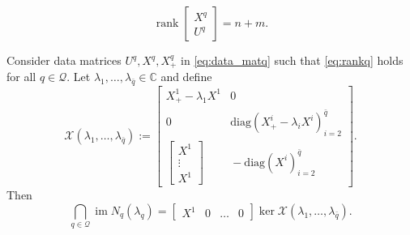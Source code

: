 \documentclass[10pt,a4paper]{amsart}
\begin{document}
\begin{equation}
    \label{eq:rankq}
    \operatorname{rank}\begin{bmatrix}
        X^q\\ U^q
    \end{bmatrix} = n + m.
\end{equation}

\begin{lemma}
    Consider data matrices $U^q, X^q, X_+^q$ in \eqref{eq:data_matq} such that \eqref{eq:rankq} holds for all $q\in\mathcal Q$. Let $\lambda_1,\dots, \lambda_{\bar q}\in\mathbb C$ and define
\begin{equation}
\label{eq:curlyX}
\!\!\!    \mathcal X(\lambda_1,\dots, \lambda_{\bar q}) \!:=\!
    \begin{bmatrix}
        X_+^1 \!- \!\lambda_1 X^1 & 0 \\
        0&\!\!\!\!\! \mathrm{diag}(X_+^i \!- \!\lambda_i X^i)_{i=2}^{\bar q}\\
        \begin{bmatrix}
            X^1\\ \vdots \\ X^1
        \end{bmatrix} &\!\!\!\!\! - \mathrm{diag}(X^i)_{i=2}^{\bar q}
    \end{bmatrix}\!.
\end{equation}
Then
\begin{equation}
    \bigcap_{q\in\mathcal Q} \operatorname{im}N_q(\lambda_q) = \begin{bmatrix} X^1 &\!\! 0 &\!\! \dots &\!\! 0\end{bmatrix} \operatorname{ker}\mathcal X(\lambda_1,\dots, \lambda_{\bar q}).
\end{equation}
\end{lemma}
\end{document}
